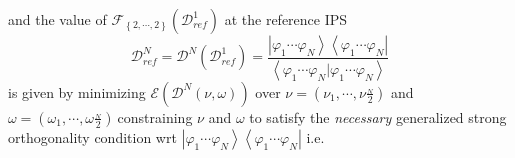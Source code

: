 \documentclass[aps,preprint]{revtex4}%
\begin{document}
and the value of $\mathcal{F}_{\left\{  2,\cdots,2\right\}  }\left(
\mathcal{D}_{ref}^{1}\right)  $ at the reference IPS
\begin{equation}
\mathcal{D}_{ref}^{N}=\mathcal{D}^{N}\left(  \mathcal{D}_{ref}^{1}\right)
=\frac{\left\vert \varphi_{1}\cdots\varphi_{N}\right\rangle \left\langle
\varphi_{1}\cdots\varphi_{N}\right\vert }{\left\langle \varphi_{1}%
\cdots\varphi_{N}|\varphi_{1}\cdots\varphi_{N}\right\rangle }%
\end{equation}
is given by minimizing $\mathcal{E}\left(  \mathcal{D}^{N}\left(  \nu
,\omega\right)  \right)  $ over $\nu=\left(  \nu_{1},\cdots,\nu\frac{_{N}}%
{2}\right)  $ and $\omega=\left(  \omega_{1},\cdots,\omega\frac{_{N}}%
{2}\right)  \mathsf{\ }$constraining $\nu$ and $\omega$ to satisfy the
\emph{necessary }generalized strong orthogonality condition wrt $\left\vert
\varphi_{1}\cdots\varphi_{N}\right\rangle \left\langle \varphi_{1}%
\cdots\varphi_{N}\right\vert $ i.e.
\end{document}

